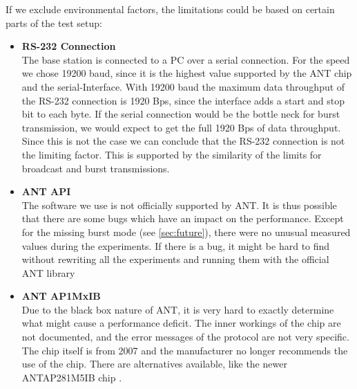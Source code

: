 If we exclude environmental factors, the limitations could be based on certain parts of the test setup:
\begin{itemize}
	\item{\textbf{RS-232 Connection}} \hfill \\ The base station is connected to a PC over a serial connection. For the speed we chose 19200 baud, since it is the highest value supported by the ANT chip and the serial-Interface. With 19200 baud the maximum data throughput of the RS-232 connection is 1920 Bps, since the interface adds a start and stop bit to each byte. If the serial connection would be the bottle neck for burst transmission, we would expect to get the full 1920 Bps of data throughput. Since this is not the case we can conclude that the RS-232 connection is not the limiting factor. This is supported by the similarity of the limits for broadcast and burst transmissions.

	\item{\textbf{ANT API}} \hfill \\ The software we use is not officially supported by ANT. It is thus possible that there are some bugs which have an impact on the performance. Except for the missing burst mode (see \ref{sec:future}), there were no unusual measured values during the experiments. If there is a bug, it might be hard to find without rewriting all the experiments and running them with the official ANT library \cite{ANTWinLib}
	
	\item{\textbf{ANT AP1MxIB}} \hfill \\ Due to the black box nature of ANT, it is very hard to exactly determine what might cause a performance deficit. The inner workings of the chip are not documented, and the error messages of the protocol are not very specific. The chip itself is from 2007 and the manufacturer no longer recommends the use of the chip\cite{AP1page}. There are alternatives available, like the newer ANTAP281M5IB chip \cite{AP2Datasheet}.
\end{itemize}
\newpage